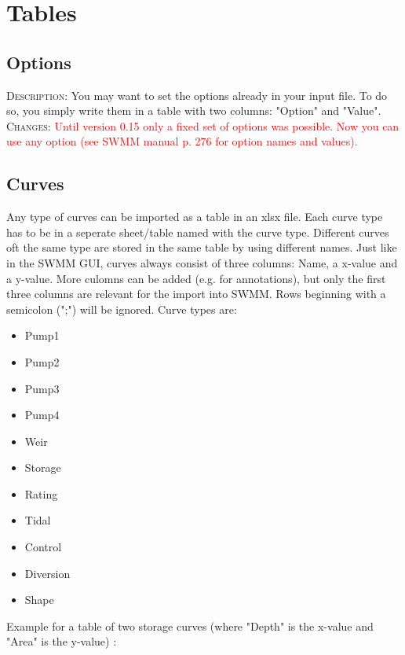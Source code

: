 \documentclass[10pt,a4paper,oneside]{scrbook}
\begin{document}
\section{Tables}

\subsection{Options}
\textsc{Description}: You may want to set the options already in your input file. To do so, you simply write them in a table with two columns: "Option" and "Value". \newline
\textsc{Changes}: \textcolor{red}{Until version 0.15 only a fixed set of options was possible. Now you can use any option (see SWMM manual \cite{rossmann2015} p. 276 for option  names and values).}


\subsection{Curves}
Any type of curves can be imported as a table in an xlsx file. Each curve type has to be in a seperate sheet/table named with the curve type. Different curves oft the same type are stored in the same table by using different names. Just like in the SWMM GUI, curves always consist of three columns: Name, a x-value and a y-value. More culomns can be added (e.g. for annotations), but only the first three columns are relevant for the import into SWMM. Rows beginning with a semicolon (";") will be ignored. Curve types are:
\begin{itemize}
	\setlength\itemsep{0pt}
	\item Pump1
	\item Pump2
	\item Pump3
	\item Pump4
	\item Weir
	\item Storage
	\item Rating
	\item Tidal
	\item Control
	\item Diversion
	\item Shape
\end{itemize}
Example for a table of two storage curves (where "Depth" is the x-value and "Area" is the y-value) :\\
\end{document}

